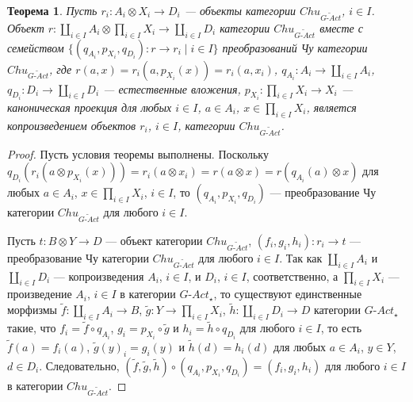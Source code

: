 \documentclass[a4paper,12pt]{article}
\newtheorem{theorem}{Теорема}
\newcommand{\GAct}{G\text{-}Act}
\begin{document}
\begin{theorem}\label{coproduct-gact}
    Пусть $r_i: A_i \otimes X_i \to D_i$ --- объекты категории $Chu_{\widetilde{\GAct}}$, $i \in I$. Объект $r: \coprod_{i \in I} A_i \otimes \prod_{i \in I} X_i \to \coprod_{i \in I} D_i$ категории $Chu_{\widetilde{\GAct}}$ вместе с семейством $\{(q_{A_i},p_{X_i},q_{D_i}): r \to r_i \mid i \in I\}$ преобразований Чу категории $Chu_{\widetilde{\GAct}}$, где $r(a,x) = r_i(a,p_{X_i}(x)) = r_i(a, x_i)$, $q_{A_i}: A_i \to \coprod_{i \in I} A_i$, $q_{D_i}: D_i \to \coprod_{i \in I} D_i$ --- естественные вложения, $p_{X_i}: \prod_{i \in I} X_i \to X_i$ --- каноническая проекция для любых $i \in I$, $a \in A_i$, $x \in \prod_{i \in I} X_i$, является копроизведением объектов $r_i$, $i \in I$, категории $Chu_{\widetilde{\GAct}}$.
\end{theorem}
\begin{proof}
    Пусть условия теоремы выполнены. Поскольку $q_{D_i}(r_i(a \otimes p_{X_i}(x))) = r_i(a \otimes x_i) = r(a \otimes x) = r(q_{A_i}(a) \otimes x)$ для любых $a \in A_i$, $x \in \prod_{i \in I} X_i$, $i \in I$, то $(q_{A_i}, p_{X_i}, q_{D_i})$ --- преобразование Чу категории $Chu_{\widetilde{\GAct}}$ для любого $i \in I$.

    Пусть $t: B \otimes Y \to D$ --- объект категории $Chu_{\widetilde{\GAct}}$, $(f_i,g_i,h_i): r_i \to t$ --- преобразование Чу категории $Chu_{\widetilde{\GAct}}$ для любого $i \in I$. Так как $\coprod_{i \in I} A_i$ и $\coprod_{i \in I} D_i$ --- копроизведения $A_i$, $ i \in I$, и $D_i$, $i \in I$, соответственно, а $\prod_{i \in I} X_i$ --- произведение $A_i$, $i \in I$ в категории $\GAct_{\star}$, то существуют единственные морфизмы $\tilde{f}: \coprod_{i \in I} A_i \to B$, $\tilde{g}: Y \to \prod_{i \in I} X_i$, $\tilde{h}: \coprod_{i \in I} D_i \to D$ категории $\GAct_{\star}$ такие, что $f_i = \tilde{f} \circ q_{A_i}$, $g_i = p_{X_i} \circ \tilde{g}$ и $h_i = \tilde{h} \circ q_{D_i}$ для любого $i \in I$, то есть $\tilde{f}(a) = f_i(a)$, $\tilde{g}(y)_i = g_i(y)$ и $\tilde{h}(d) = h_i(d)$ для любых $a \in A_i$, $y \in Y$, $d \in D_i$. Следовательно, $(\tilde{f},\tilde{g},\tilde{h}) \circ (q_{A_i}, p_{X_i}, q_{D_i}) = (f_i, g_i, h_i)$ для любого $i \in I$ в категории $Chu_{\widetilde{\GAct}}$.


\end{proof}
\end{document}

